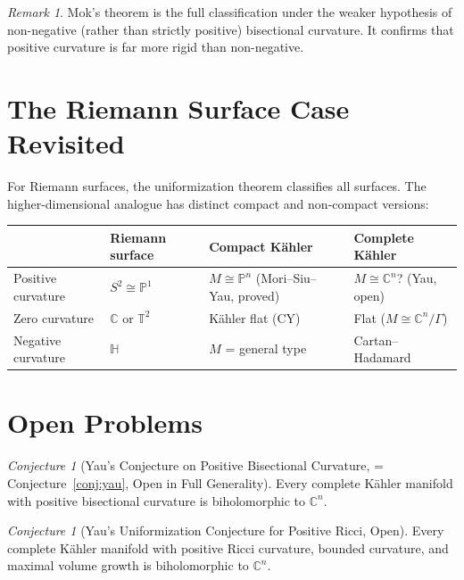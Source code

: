 \documentclass[12pt,a4paper]{amsart}
\theoremstyle{definition}
\theoremstyle{remark}
\newtheorem{remark}[theorem]{Remark}
\newtheorem{conjecture}[theorem]{Conjecture}
\newcommand{\CC}{\mathbb{C}}
\newcommand{\PP}{\mathbb{P}}
\newcommand{\TT}{\mathbb{T}}
\begin{document}
\begin{remark}
Mok's theorem is the full classification under the weaker hypothesis of
non-negative (rather than strictly positive) bisectional curvature.
It confirms that positive curvature is far more rigid than non-negative.
\end{remark}

\section{The Riemann Surface Case Revisited}

For Riemann surfaces, the uniformization theorem classifies all surfaces.
The higher-dimensional analogue has distinct compact and non-compact versions:

\begin{center}
\begin{tabular}{p{3cm}p{3.5cm}p{3.5cm}p{3.5cm}}
\toprule
 & Riemann surface & Compact Kähler & Complete Kähler \\
\midrule
Positive curvature & $S^2 \cong \PP^1$ & $M \cong \PP^n$ (Mori--Siu--Yau, proved) & $M \cong \CC^n$? (Yau, open) \\[4pt]
Zero curvature & $\CC$ or $\TT^2$ & Kähler flat (CY) & Flat ($M \cong \CC^n/\Gamma$) \\[4pt]
Negative curvature & $\mathbb{H}$ & $M$ = general type & Cartan--Hadamard \\
\bottomrule
\end{tabular}
\end{center}

\section{Open Problems}

\begin{conjecture}[Yau's Conjecture on Positive Bisectional Curvature,
= Conjecture~\ref{conj:yau}, Open in Full Generality]
Every complete Kähler manifold with positive bisectional curvature is
biholomorphic to $\CC^n$.
\end{conjecture}

\begin{conjecture}[Yau's Uniformization Conjecture for Positive Ricci, Open]
Every complete Kähler manifold with positive Ricci curvature, bounded
curvature, and maximal volume growth is biholomorphic to $\CC^n$.
\end{conjecture}
\end{document}
